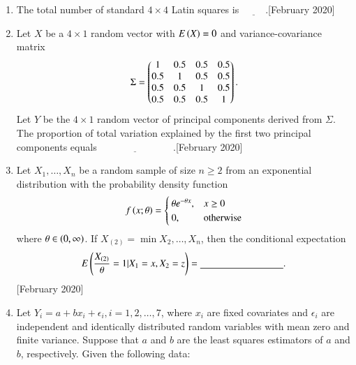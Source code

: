 \documentclass[journal]{IEEEtran}
\begin{document}
\begin{enumerate}
\begin{align}
    P\brak{X = x, Y = y, Z = z} = \frac{10!}{x! y! z!} \brak{0.2}^x \brak{0.3}^y \brak{0.4}^z \brak{0.1}^t
    \end{align}
    where $t = 10 - x - y - z$, $x, y, z = 0, 1, \dots, 10$; $x + y + z \leq 10$.
    Then the variance of the random variable $Y + 2Z$ equals $\underline{\hspace{0.2cm}}$ .\hfill[February 2020]
    \item The total number of standard $4 \times 4$ Latin squares is $\underline{\hspace{1cm}}$.\hfill[February 2020]
     \item Let $X$ be a $4 \times 1$ random vector with ${E}\left(X\right) = 0$ and variance-covariance matrix
    \begin{align}
    \Sigma = \begin{pmatrix}1 & 0.5 & 0.5 & 0.5 \\ 0.5 & 1 & 0.5 & 0.5 \\ 0.5 & 0.5 & 1 & 0.5 \\ 0.5 & 0.5 & 0.5 & 1\end{pmatrix}.
    \end{align}
    Let $Y$ be the $4 \times 1$ random vector of principal components derived from $\Sigma$. The proportion of total variation explained by the first two principal components equals $\underline{\hspace{3cm}}$ .\hfill[February 2020]
  \item Let $X_1, \dots, X_n$ be a random sample of size $n \geq 2$ from an exponential distribution with the probability density function
    \begin{align}
    f\left(x; \theta\right) = 
    \begin{cases} 
      \theta e^{-\theta x}, & x \geq 0 \\ 
      0, & \text{otherwise} 
    \end{cases}
    \end{align}
    where $\theta \in \left(0, \infty\right)$. If $X_{(2)} = \min {X_2, \dots, X_n}$, then the conditional expectation
    \begin{align}
    {E} \brak{ \frac{X_{\brak{2}}}{\theta} = 1  |  X_1 = x,  X_2 = z } = \underline{\hspace{3cm}}.
    \end{align}\hfill[February 2020]
     \item Let $Y_i = a + b x_i + \epsilon_i,i = 1, 2, \dots, 7$, where $x_i$ are fixed covariates and $\epsilon_i$ are independent and identically distributed random variables with mean zero and finite variance. Suppose that $a$ and $b$ are the least squares estimators of $a$ and $b$, respectively. Given the following data:

\end{enumerate}
\end{document}
